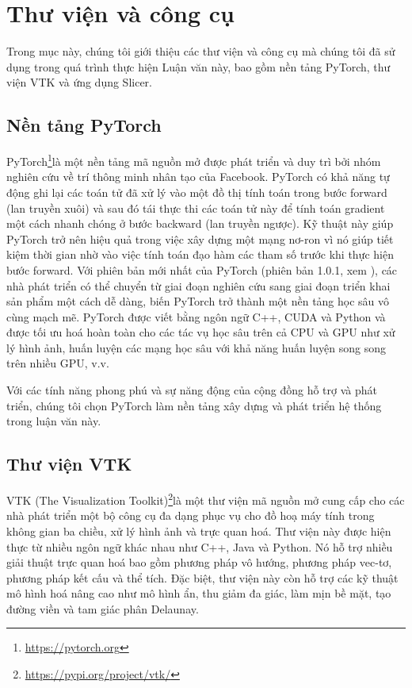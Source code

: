 \section{Thư viện và công cụ} 
\label{sec:thu_vien_va_cong_cu}
	Trong mục này, chúng tôi giới thiệu các thư viện và công cụ mà chúng tôi đã sử dụng trong quá trình thực hiện Luận văn này, bao gồm nền tảng PyTorch, thư viện VTK và ứng dụng Slicer.

\subsection{Nền tảng PyTorch}
\label{subsec:nen_tang_pytorch}
	PyTorch\footnote{\url{https://pytorch.org}}là một nền tảng mã nguồn mở được phát triển và duy trì bởi nhóm nghiên cứu về trí thông minh nhân tạo của Facebook. PyTorch có khả năng tự động ghi lại các toán tử đã xử lý vào một đồ thị tính toán trong bước forward (lan truyền xuôi) và sau đó tái thực thi các toán tử này để tính toán gradient một cách nhanh chóng ở bước backward (lan truyền ngược). Kỹ thuật này giúp PyTorch trở nên hiệu quả trong việc xây dựng một mạng nơ-ron vì nó giúp tiết kiệm thời gian nhờ vào việc tính toán đạo hàm các tham số trước khi thực hiện bước forward. Với phiên bản mới nhất của PyTorch (phiên bản 1.0.1, xem \cite{Soumith2019}), các nhà phát triển có thể chuyển từ giai đoạn nghiên cứu sang giai đoạn triển khai sản phẩm một cách dễ dàng, biến PyTorch trở thành một nền tảng học sâu vô cùng mạch mẽ. PyTorch được viết bằng ngôn ngữ C++, CUDA và Python và được tối ưu hoá hoàn toàn cho các tác vụ học sâu trên cả CPU và GPU như xử lý hình ảnh, huấn luyện các mạng học sâu với khả năng huấn luyện song song trên nhiều GPU, v.v.
	
	Với các tính năng phong phú và sự năng động của cộng đồng hỗ trợ và phát triển, chúng tôi chọn PyTorch làm nền tảng xây dựng và phát triển hệ thống trong luận văn này.
	
\newpage
\subsection{Thư viện VTK}
\label{subsec:thu_vien_vtk}
	VTK (The Visualization Toolkit)\footnote{\url{https://pypi.org/project/vtk/}}là một thư viện mã nguồn mở cung cấp cho các nhà phát triển một bộ công cụ đa dạng phục vụ cho đồ hoạ máy tính trong không gian ba chiều, xử lý hình ảnh và trực quan hoá. Thư viện này được hiện thực từ nhiều ngôn ngữ khác nhau như C++, Java và Python. Nó hỗ trợ nhiều giải thuật trực quan hoá bao gồm phương pháp vô hướng, phương pháp vec-tơ, phương pháp kết cấu và thể tích. Đặc biệt, thư viện này còn hỗ trợ các kỹ thuật mô hình hoá nâng cao như mô hình ẩn, thu giảm đa giác, làm mịn bề mặt, tạo đường viền và tam giác phân Delaunay.
	
